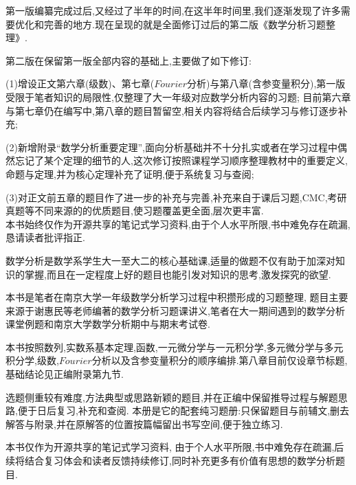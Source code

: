 \documentclass[a4paper,12pt,fleqn,openany,twoside,fontset=windows]{ctexbook}
\begin{document}
\maketitle
\frontmatter

\begin{booknotebody}
第一版编纂完成过后,又经过了半年的时间,在这半年时间里,我们逐渐发现了许多需要优化和完善的地方.现在呈现的就是全面修订过后的第二版《数学分析习题整理》.

第二版在保留第一版全部内容的基础上,主要做了如下修订: 

(1)增设正文第六章(级数)、第七章($Fourier$分析)与第八章(含参变量积分),第一版受限于笔者知识的局限性,仅整理了大一年级对应数学分析内容的习题;
目前第六章与第七章仍在编写中,第八章的题目暂留空,相关内容将结合后续学习与修订逐步补充;

(2)新增附录“数学分析重要定理”,面向分析基础并不十分扎实或者在学习过程中偶然忘记了某个定理的细节的人,这次修订按照课程学习顺序整理教材中的重要定义,命题与定理,并为核心定理补充了证明,便于系统复习与查阅; 

(3)对正文前五章的题目作了进一步的补充与完善,补充来自于课后习题,CMC,考研真题等不同来源的的优质题目,使习题覆盖更全面,层次更丰富. \\

本书始终仅作为开源共享的笔记式学习资料,由于个人水平所限,书中难免存在疏漏,恳请读者批评指正.

\par\vspace{2.5em}
\end{booknotebody}
\clearpage

\begin{booknotebody}
数学分析是数学系学生大一至大二的核心基础课,适量的做题不仅有助于加深对知识的掌握,而且在一定程度上好的题目也能引发对知识的思考,激发探究的欲望.

本书是笔者在南京大学一年级数学分析学习过程中积攒形成的习题整理,
题目主要来源于谢惠民等老师编著的数学分析习题课讲义,笔者在大一期间遇到的数学分析课堂例题和南京大学数学分析期中与期末考试卷. 

本书按照数列,实数系基本定理,函数,一元微分学与一元积分学,多元微分学与多元积分学,级数,$Fourier$分析以及含参变量积分的顺序编排.第八章目前仅设章节标题,基础结论见正编附录第九节.

选题侧重较有难度,方法典型或思路新颖的题目,并在正编中保留推导过程与解题思路,便于日后复习,补充和查阅. 
本册是它的配套纯习题册:只保留题目与前辅文,删去解答与附录,并在原解答的位置按篇幅留出书写空间,便于独立练习. 

本书仅作为开源共享的笔记式学习资料,
由于个人水平所限,书中难免存在疏漏,后续将结合复习体会和读者反馈持续修订,同时补充更多有价值有思想的数学分析题目.

\par\vspace{2.5em}
\end{booknotebody}
\clearpage
\end{document}
